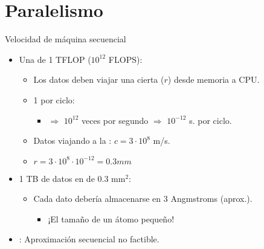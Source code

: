 \section{Paralelismo}

\begin{frame}[t]{Velocidad de máquina secuencial}
\begin{itemize}
  \item Una  de 1 TFLOP ($10^{12}$ FLOPS):
    \begin{itemize}
      \item Los datos deben viajar una cierta  ($r$) desde memoria a CPU.
      \item 1  por ciclo:
        \begin{itemize}
          \item $\Rightarrow$ $10^{12}$ veces por segundo $\Rightarrow$ $10^{-12}$ s. por ciclo.
        \end{itemize}
      \item Datos viajando a la : $c=3 \cdot 10^8$ m/s.
      \item $r = 3 \cdot 10^8 \cdot 10^{-12} = 0.3 mm$
    \end{itemize}

  \item 1 TB de datos en  de 0.3 mm$^2$:
    \begin{itemize}
      \item Cada dato debería almacenarse en 3 Angmstroms (aprox.).
        \begin{itemize}
          \item ¡El tamaño de un átomo pequeño!
        \end{itemize}
    \end{itemize}

  \item {}: Aproximación secuencial no factible.
\end{itemize}
\end{frame}

